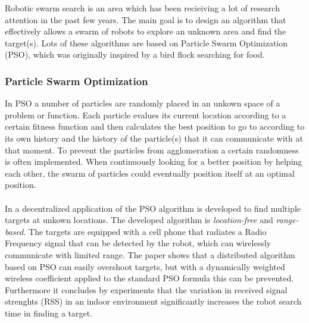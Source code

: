 
Robotic swarm search is an area which has been recieiving a lot of research attention in the past few years. The main goal is to design an algorithm that effectively allows a swarm of robots to explore an unknown area and find the target(s). Lots of these algorithms are based on Particle Swarm Optimization (PSO), which was originally inspired by a bird flock searching for food. \cite{kennedy1995particle}\\

\subsubsection{Particle Swarm Optimization}
	In PSO a number of particles are randomly placed in an unkown space of a problem or function. Each particle evalues its current location according to a certain fitness function and then calculates the best position to go to according to its own history and the history of the particle(s) that it can communicate with at that moment. To prevent the particles from agglomeration a certain randomness is often implemented. When continuously looking for a better position by helping each other, the swarm of particles could eventually position itself at an optimal position. \cite{poli2007particle} \\
	\\
	In \cite{derr2009multi} a decentralized application of the PSO algorithm is developed to find multiple targets at unkown locations. The developed algorithm is \emph{location-free} and \emph{range-based}. The targets are equipped with a cell phone that radiates a Radio Frequency signal that can be detected by the robot, which can wirelessly communicate with limited range. The paper shows that a distributed algorithm based on PSO can easily overshoot targets, but with a dynamically weighted wireless coefficient applied to the standard PSO formula this can be prevented. Furthermore it concludes by experiments that the variation in received signal strenghts (RSS) in an indoor environment significantly increases the robot search time in finding a target.\\

